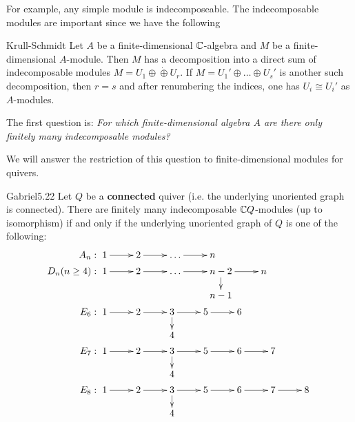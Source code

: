 \documentclass[twoside = false,	%
		headsepline,		%
		parskip = true,
		]{scrbook}						%
\begin{document}
    For example, any simple module is indecomposeable. The indecomposable modules are important since we have the following

    \begin{theorem}{}{Krull-Schmidt}
        Let $A$ be a finite-dimensional $\mathbb C$-algebra and $M$ be a finite-dimensional $A$-module. Then $M$ has a decomposition into a direct sum of indecomposable modules $M = U_1 \oplus \dot \oplus U_r$. If $M = U_1' \oplus \dots \oplus U_s'$ is another such decomposition, then $r=s$ and after renumbering the indices, one has $U_i \cong U_i'$ as $A$-modules.
    \end{theorem}

    The first question is: \textit{For which finite-dimensional algebra $A$ are there only finitely many indecomposable modules?}

    We will answer the restriction of this question to finite-dimensional modules for quivers.

    \begin{theorem}{Gabriel}{5.22}
        Let $Q$ be a \textbf{connected} quiver (i.e. the underlying unoriented graph is connected). There are finitely many indecomposable $\mathbb C Q$-modules (up to isomorphism) if and only if the underlying unoriented graph of $Q$ is one of the following:
        \begin{equation*}
        \begin{split}
            A_n&: \xymatrix @R=12pt {1 \ar[r] & 2 \ar[r] & \dots \ar[r] & n} \\
            D_n (n \geq 4) &: \xymatrix @R=12pt {1 \ar[r] & 2 \ar[r] & \dots \ar[r] & n-2 \ar[d] \ar[r] & n \\
            & & & n-1} \\
            E_6 &: \xymatrix @R=12pt {1 \ar[r] & 2 \ar[r] & 3 \ar[r] \ar[d] & 5                         \ar[r] & 6 \\
                                       &   & 4 } \\
            E_7 &: \xymatrix @R=12pt {1 \ar[r] & 2 \ar[r] & 3 \ar[r] \ar[d] & 5                         \ar[r] & 6 \ar[r] & 7 \\
                                       &   & 4 } \\
            E_8 &: \xymatrix @R=12pt {1 \ar[r] & 2 \ar[r] & 3 \ar[r] \ar[d] & 5                         \ar[r] & 6 \ar[r] & 7 \ar[r] & 8\\
                                       &   & 4 } \\
        \end{split}
        \end{equation*}
    \end{theorem}
\end{document}
